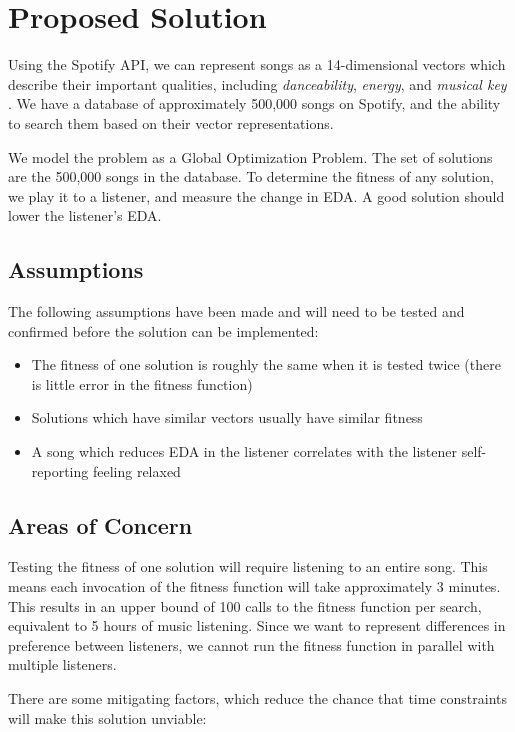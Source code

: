 \documentclass{article}
\begin{document}
	\section{Proposed Solution}
	Using the Spotify API, we can represent songs as a 14-dimensional vectors which describe their important qualities, including \emph{danceability}, \emph{energy}, and \emph{musical key} \cite{spotify_get_nodate, jehan_analyzer_nodate}. We have a database of approximately 500,000 songs on Spotify, and the ability to search them based on their vector representations.
	
	We model the problem as a Global Optimization Problem. The set of solutions are the 500,000 songs in the database. To determine the fitness of any solution, we play it to a listener, and measure the change in EDA. A good solution should lower the listener's EDA.
	
	\subsection{Assumptions}
	The following assumptions have been made and will need to be tested and confirmed before the solution can be implemented:
	
	\begin{itemize}
		\item The fitness of one solution is roughly the same when it is tested twice (there is little error in the fitness function)
		\item Solutions which have similar vectors usually have similar fitness
		\item A song which reduces EDA in the listener correlates with the listener self-reporting feeling relaxed
	\end{itemize}

	\subsection{Areas of Concern}
	Testing the fitness of one solution will require listening to an entire song. This means each invocation of the fitness function will take approximately 3 minutes. This results in an upper bound of 100 calls to  the fitness function per search, equivalent to 5 hours of music listening. Since we want to represent differences in preference between listeners, we cannot run the fitness function in parallel with multiple listeners.

	There are some mitigating factors, which reduce the chance that time constraints will make this solution unviable:
	
\end{document}
